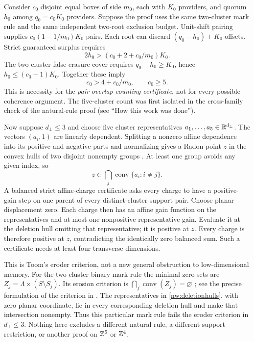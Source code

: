 \begin{remark}\label{nw:mechanism}
Consider $c_0$ disjoint equal boxes of side $m_0$, each with $K_0$ providers, and quorum $h_0$ among $q_0=c_0K_0$ providers. Suppose the proof uses the same two-cluster mark rule and the same independent two-root exclusion budget. Unit-shift pairing supplies $c_0(1-1/m_0)K_0$ pairs. Each root can discard $(q_0-h_0)+K_0$ offsets. Strict guaranteed surplus requires
\[
 2h_0>(c_0+2+c_0/m_0)K_0.
\]
The two-cluster false-erasure cover requires $q_0-h_0\ge K_0$, hence $h_0\le(c_0-1)K_0$. Together these imply
\[
 c_0>4+c_0/m_0,\qquad c_0\ge5.
\]
This is necessity for the \emph{pair-overlap counting certificate}, not for every possible coherence argument. The five-cluster count was first isolated in the cross-family check of the natural-rule proof (see ``How this work was done'').

Now suppose $d_\perp\le3$ and choose five cluster representatives $a_1,\ldots,a_5\in\mathbb{R}^{d_\perp}$. The vectors $(a_i,1)$ are linearly dependent. Splitting a nonzero affine dependence into its positive and negative parts and normalizing gives a Radon point $z$ in the convex hulls of two disjoint nonempty groups \cite{Radon21}. At least one group avoids any given index, so
\begin{equation}\label{nw:deletionhulls}
 z\in\bigcap_j\operatorname{conv}\{a_i:i\ne j\}.
\end{equation}
A balanced strict affine-charge certificate asks every charge to have a positive-gain step on one parent of every distinct-cluster support pair. Choose planar displacement zero. Each charge then has an affine gain function on the representatives and at most one nonpositive representative gain. Evaluate it at the deletion hull omitting that representative; it is positive at $z$. Every charge is therefore positive at $z$, contradicting the identically zero balanced sum. Such a certificate needs at least four transverse dimensions.

This is Toom's eroder criterion, not a new general obstruction to low-dimensional memory. For the two-cluster binary mark rule the minimal zero-sets are $Z_j=\Lambda\times(S\setminus S_j)$. Its erosion criterion is $\bigcap_j\operatorname{conv}(Z_j)=\varnothing$ \cite{Toom80}; see the precise formulation of the criterion in \cite[Proposition~3]{SST26}. The representatives in \eqref{nw:deletionhulls}, with zero planar coordinate, lie in every corresponding deletion hull and make that intersection nonempty. Thus this particular mark rule fails the eroder criterion in $d_\perp\le3$. Nothing here excludes a different natural rule, a different support restriction, or another proof on $\mathbb{Z}^5$ or $\mathbb{Z}^4$.


\end{remark}
